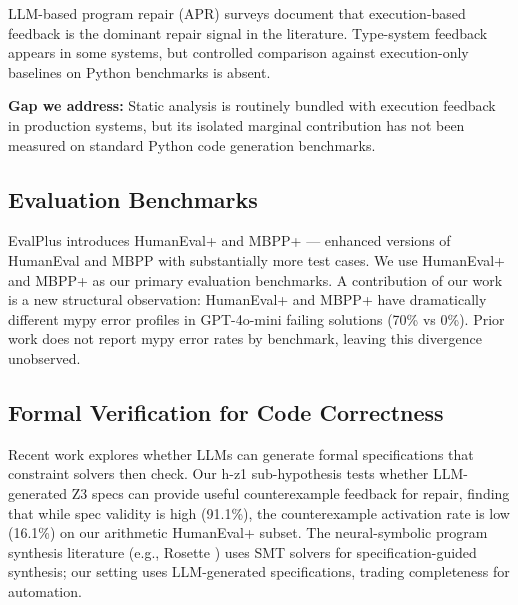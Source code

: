 LLM-based program repair (APR) surveys \citep{Xia2023Automated} document that
execution-based feedback is the dominant repair signal in the literature.
Type-system feedback appears in some systems, but controlled comparison against
execution-only baselines on Python benchmarks is absent.

\textbf{Gap we address:} Static analysis is routinely bundled with execution
feedback in production systems, but its isolated marginal contribution has not
been measured on standard Python code generation benchmarks.

\subsection{Evaluation Benchmarks}

EvalPlus \citep{Liu2023EvalPlus} introduces HumanEval+ and MBPP+ --- enhanced
versions of HumanEval \citep{Chen2021Evaluating} and MBPP \citep{Austin2021Program}
with substantially more test cases. We use HumanEval+ and MBPP+ as our primary
evaluation benchmarks. A contribution of our work is a new structural observation:
HumanEval+ and MBPP+ have dramatically different mypy error profiles in
GPT-4o-mini failing solutions (70\% vs 0\%). Prior work does not report mypy
error rates by benchmark, leaving this divergence unobserved.

\subsection{Formal Verification for Code Correctness}

Recent work explores whether LLMs can generate formal specifications that
constraint solvers then check. Our h-z1 sub-hypothesis tests whether
LLM-generated Z3 specs can provide useful counterexample feedback for repair,
finding that while spec validity is high (91.1\%), the counterexample activation
rate is low (16.1\%) on our arithmetic HumanEval+ subset. The neural-symbolic
program synthesis literature (e.g., Rosette \citep{Torlak2014Growing}) uses SMT
solvers for specification-guided synthesis; our setting uses LLM-generated
specifications, trading completeness for automation.
